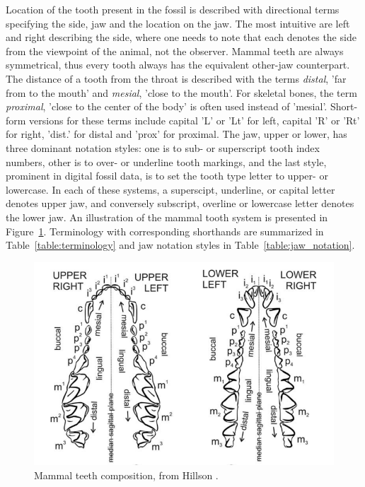 \documentclass[english,twoside,openright]{HYgraduMLDS}
\begin{document}
Location of the tooth present in the fossil is described with directional terms specifying the side, jaw and the location on the jaw.
The most
intuitive are left and right describing the side, where one needs to note that each denotes the side from the viewpoint of the 
animal, not the observer. Mammal teeth are always symmetrical, thus every tooth always has the 
equivalent other-jaw counterpart. The distance of a tooth from the throat 
is described with the terms \textit{distal}, 'far from to the mouth' and \textit{mesial}, 'close to the mouth'. For skeletal bones, the term \textit{proximal}, 
'close to the center of the body' is often used instead of 'mesial'.
Short-form versions for these terms include capital 'L' or 'Lt' for left, capital 'R' or 'Rt' for right, 'dist.' 
for distal and 'prox' for proximal.
The jaw, upper or lower, has three dominant notation styles: one is to sub- or superscript tooth index numbers, other is to 
over- or underline tooth markings, and the last style, prominent in digital fossil data, is to set the tooth type letter to upper- or lowercase.
In each of these systems, a superscipt, underline, or capital letter denotes upper jaw, and conversely subscript, overline or lowercase letter denotes the lower jaw.
An illustration of the mammal tooth system is presented in Figure~\ref{image:mammal_teeth}. Terminology with corresponding shorthands are summarized in Table~\ref{table:terminology} and jaw notation styles in Table~\ref{table:jaw_notation}.

\begin{figure}[h]
    \centering
    \includegraphics*[scale=0.43]{../images/teeth_img_hillson_book.png}
    \caption{Mammal teeth composition, from Hillson \cite{Hillson_2005}.}
    \label{image:mammal_teeth}
\end{figure}
\end{document}
